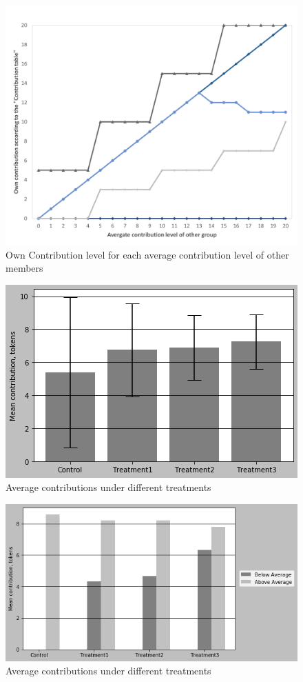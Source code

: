 \documentclass[12pt]{article}
\begin{document}
\begin{figure}[ht]
    \centering
    \includegraphics[scale = 0.7]{con_con.png}
    \caption{Own Contribution level for each average contribution level of other members}\label{fig:con_con}
\end{figure}



\begin{figure}[ht]
    \centering
    \includegraphics[scale = 0.9]{bar_plot_with_error_bars_!.png}
    \caption{Average contributions under different treatments}\label{fig:avg_con}
\end{figure}

\begin{figure}[ht]
    \centering
    \includegraphics[scale = 0.9]{compare.png}
    \caption{Average contributions under different treatments}\label{fig:compare}
\end{figure}
\end{document}

